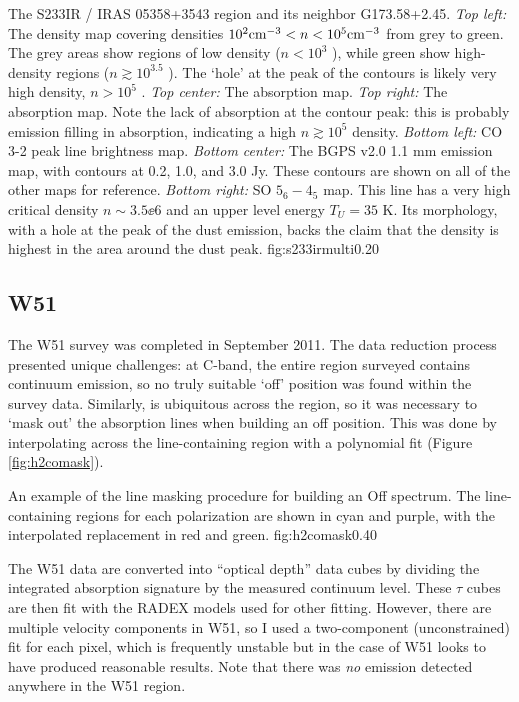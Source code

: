 {The S233IR / IRAS 05358+3543 region and its neighbor G173.58+2.45.
\textit{Top left:} The \formaldehyde density map covering densities
$10^2 \textrm{cm}^{-3}<n<10^5 \textrm{cm}^{-3}$ from grey to green.  The grey areas show
regions of low density ($n<10^3$ \percc), while green show high-density
regions ($n\gtrsim10^{3.5}$ \percc).  The `hole' at the peak of the contours
is likely very high density, $n>10^5$ \percc.
\textit{Top center: } The \formaldehyde \oneone absorption map.
\textit{Top right: } The \formaldehyde \twotwo absorption map.
Note the lack of absorption at the contour peak: this is probably \twotwo emission
filling in \twotwo absorption, indicating a high $n\gtrsim10^5$ \percc density.
\textit{Bottom left: } CO 3-2 peak line brightness map.
\textit{Bottom center: } The BGPS v2.0 1.1 mm emission map, with contours at 0.2, 1.0, and 3.0 Jy.
These contours are shown on all of the other maps for reference.
\textit{Bottom right: } SO $5_6-4_5$ map.  This line has a very high critical density $n\sim3.5\ee{6}$ \percc
and an upper level energy $T_U=35$ K.
Its morphology, with a hole at the peak of the dust emission, backs the claim that the density is highest
in the area around the dust peak.}
{fig:s233irmulti}{0.2}{0}



\subsection{W51}
The W51 survey was completed in September 2011.  The data reduction process
presented unique challenges: at C-band, the entire region surveyed contains
continuum emission, so no truly suitable `off' position was found within the
survey data.  Similarly, \formaldehyde is ubiquitous across the region, so it
was necessary to `mask out' the absorption lines when building an off position.
This was done by interpolating across the line-containing region with a
polynomial fit (Figure \ref{fig:h2comask}).  

{An example of the \formaldehyde line masking procedure for building an Off
spectrum.  The line-containing regions for each polarization are shown in cyan
and purple, with the interpolated replacement in red and green.
}{fig:h2comask}{0.4}{0}

The W51 data are converted into ``optical depth'' data cubes by dividing the
integrated \formaldehyde absorption signature by the measured continuum level.
These $\tau$ cubes are then fit with the RADEX models used for other
\formaldehyde fitting.  However, there are multiple velocity components in W51,
so I used a two-component (unconstrained) fit for each pixel, which is
frequently unstable but in the case of W51 looks to have produced reasonable
results.  Note that there was \emph{no} \formaldehyde emission detected anywhere
in the W51 region.


